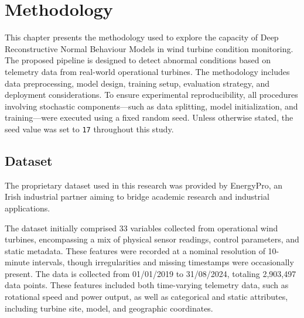 

\chapter{Methodology}
\label{ch:methodology}


\graphicspath{
    {3_methodology/figures/PNG/}
    {3_methodology/figures/PDF/}
    {3_methodology/figures/EPS/}
    {3_methodology/figures/}
}


This chapter presents the methodology used to explore the capacity of Deep Reconstructive Normal Behaviour Models in wind turbine condition monitoring.
The proposed pipeline is designed to detect abnormal conditions based on telemetry data from real-world operational turbines.
The methodology includes data preprocessing, model design, training setup, evaluation strategy, and deployment considerations.
To ensure experimental reproducibility, all procedures involving stochastic components—such as data splitting, model initialization, and training—were executed using a fixed random seed.
Unless otherwise stated, the seed value was set to \texttt{17} throughout this study.


\section{Dataset}
\label{sec:dataset}

The proprietary dataset used in this research was provided by EnergyPro, an Irish industrial partner aiming to bridge academic research and industrial applications. 

The dataset initially comprised 33 variables collected from operational wind turbines, encompassing a mix of physical sensor readings, control parameters, and static metadata.
These features were recorded at a nominal resolution of 10-minute intervals, though irregularities and missing timestamps were occasionally present.
The data is collected from 01/01/2019 to 31/08/2024, totaling 2,903,497 data points.
These features included both time-varying telemetry data, such as rotational speed and power output, as well as categorical and static attributes, including turbine site, model, and geographic coordinates.

